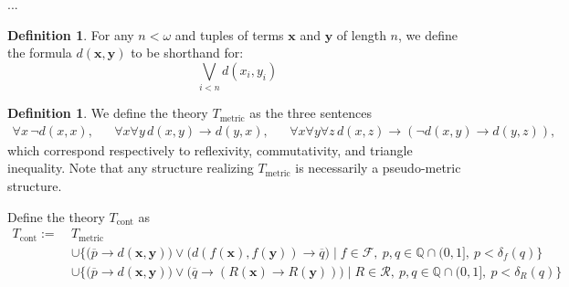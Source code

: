\documentclass{amsart}
\theoremstyle{definition}
\newtheorem{definition}[theorem]{Definition}
\numberwithin{equation}{theorem}
\newcommand{\Q}{\mathbb{Q}}
\newcommand{\V}{\mathbf}
\newcommand{\where}{\mid}
\newcommand{\rat}[1]{{\overline{#1}}}
\newcommand{\narrow}[1]{\xrightarrow{#1}}
\renewcommand{\to}{\narrow{}}
\begin{document}
...
\begin{definition}
  For any $n<\omega$ and tuples of terms $\V x$ and $\V y$ of length $n$, we define the formula $d(\V x, \V y)$ to be shorthand for:
  \[
    \bigvee_{i<n}d(x_i, y_i)
  \]
\end{definition}
\begin{definition}
  We define the theory $T_\text{metric}$ as the three sentences
  \begin{align*}
    \forall x\,\neg d(x, x),&&
    \forall x\forall y\,d(x, y)\to d(y, x),&&
    \forall x\forall y\forall z\,d(x, z)\to(\neg d(x, y)\to d(y, z)),
  \end{align*}
  which correspond respectively to reflexivity, commutativity, and triangle inequality.
  Note that any structure realizing $T_\text{metric}$ is necessarily a pseudo-metric structure.
  
  Define the theory $T_\text{cont}$ as
  \begin{align*}
    T_\text{cont}:=\ &T_\text{metric}\\
    &\cup\Big\{\Big(\rat p\to d(\V x, \V y)\Big)\vee \Big(d(f(\V x), f(\V y))\to\rat q\Big)\where f\in\mathscr F,\ p,q\in\Q\cap(0,1],\ p<\delta_f(q)\}\\
    &\cup\Big\{\Big(\rat p\to d(\V x, \V y)\Big)\vee \Big(\rat q\to (R(\V x)\to R(\V y))\Big)\where R\in\mathscr R,\ p,q\in\Q\cap(0,1],\ p<\delta_R(q)\}\\
  \end{align*}
\end{definition}

  
  {}
  

%
%
%
%
%
\end{document}
